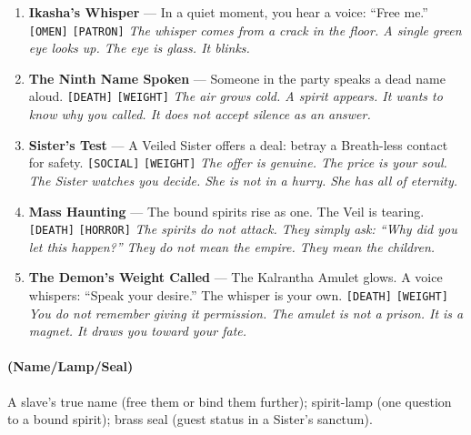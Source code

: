 \begin{enumerate}
\item \textbf{Ikasha's Whisper} --- In a quiet moment, you hear a voice: ``Free me.'' \texttt{[OMEN]} \texttt{[PATRON]}
  \hfill \textit{The whisper comes from a crack in the floor. A single green eye looks up. The eye is glass. It blinks.}
\item[J] \textbf{The Ninth Name Spoken} --- Someone in the party speaks a dead name aloud. \texttt{[DEATH]} \texttt{[WEIGHT]}
  \hfill \textit{The air grows cold. A spirit appears. It wants to know why you called. It does not accept silence as an answer.}
\item[Q] \textbf{Sister's Test} --- A Veiled Sister offers a deal: betray a Breath-less contact for safety. \texttt{[SOCIAL]} \texttt{[WEIGHT]}
  \hfill \textit{The offer is genuine. The price is your soul. The Sister watches you decide. She is not in a hurry. She has all of eternity.}
\item[K] \textbf{Mass Haunting} --- The bound spirits rise as one. The Veil is tearing. \texttt{[DEATH]} \texttt{[HORROR]}
  \hfill \textit{The spirits do not attack. They simply ask: ``Why did you let this happen?'' They do not mean the empire. They mean the children.}
\item[A] \textbf{The Demon's Weight Called} --- The Kalrantha Amulet glows. A voice whispers: ``Speak your desire.'' The whisper is your own. \texttt{[DEATH]} \texttt{[WEIGHT]}
  \hfill \textit{You do not remember giving it permission. The amulet is not a prison. It is a magnet. It draws you toward your fate.}
\end{enumerate}

\paragraph*{(Name/Lamp/Seal)} A slave's true name (free them or bind them further); spirit-lamp (one question to a bound spirit); brass seal (guest status in a Sister's sanctum).

